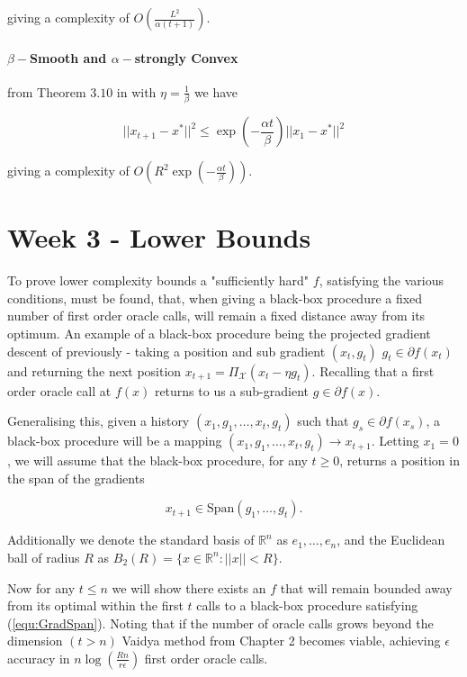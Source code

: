 giving a complexity of $O\left(\frac{L^2}{\alpha (t+1)}\right)$.


\paragraph{$\beta-$Smooth and $\alpha-$strongly Convex} from Theorem $3.10$ in \cite{bubeck} with $\eta = \frac{1}{\beta}$ we have

\begin{equation}
||x_{t+1} - x^* ||^2 \leq \exp\left( - \frac{\alpha t}{\beta}\right) ||x_1 - x^*||^2
\end{equation}


giving a complexity of $O\left( R^2 \exp\left( - \frac{\alpha t}{\beta}\right) \right)$.





\section{Week 3 - Lower Bounds}

To prove lower complexity bounds a "sufficiently hard" $f$, satisfying the various conditions, must be found, that, when giving a black-box procedure a fixed number of first order oracle calls, will remain a fixed distance away from its optimum.  An example of a black-box procedure being the projected gradient descent of previously - taking a position and sub gradient $(x_t,g_t)$ $g_t \in \partial f(x_t)$ and returning the next position $x_{t+1} = \Pi_{\mathcal{X}}(x_t - \eta g_t)$. Recalling that a first order oracle call at $f(x)$ returns to us a sub-gradient $g \in \partial f(x)$.


Generalising this, given a history $(x_1,g_1,\dots,x_t,g_t)$ such that $g_s \in \partial f(x_s)$, a black-box procedure will be a mapping $(x_1,g_1,\dots,x_t,g_t) \rightarrow x_{t+1}$.  Letting $x_1 = 0$, we will assume that the black-box procedure, for any $t \geq 0$, returns a position in the span of the gradients

\begin{equation}
x_{t+1} \in \text{Span}(g_1,\dots,g_t).
\label{equ:GradSpan}
\end{equation}


Additionally we denote the standard basis of $\mathbb{R}^n$ as $e_1,\dots,e_n$, and the Euclidean ball of radius $R$ as $B_2(R) = \{x \in \mathbb{R}^n : ||x||<R\}$.  


Now for any $t \leq n$ we will show there exists an $f$ that will remain bounded away from its optimal within the first $t$ calls to a black-box procedure satisfying (\ref{equ:GradSpan}).  Noting that if the number of oracle calls grows beyond the dimension $(t > n)$ Vaidya method from Chapter 2 becomes viable, achieving $\epsilon$ accuracy in $n\log(\frac{Rn}{r \epsilon})$ first order oracle calls.


